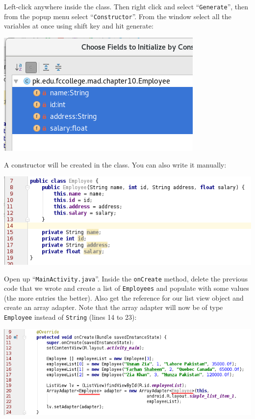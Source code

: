 Left-click anywhere inside the class. Then right click and select ``\texttt{Generate}'', then from the popup menu select ``\texttt{Constructor}''. From the window select all the variables at once using shift key and hit generate:

\begin{center}
	\includegraphics[scale=0.4]{chapters/ch10/images/13}
\end{center}

A constructor will be created in the class. You can also write it manually:

\begin{center}
	\includegraphics[scale=0.4]{chapters/ch10/images/14}
\end{center}

Open up ``\texttt{MainActivity.java}''. Inside the \texttt{onCreate} method, delete the previous code that we wrote and create a list of \texttt{Employees} and populate with some values (the more entries the better). Also get the reference for our list view object and create an array adapter. Note that the array adapter will now be of type \texttt{Employee} instead of \texttt{String} (lines 14 to 23):

\begin{center}
	\includegraphics[scale=0.4]{chapters/ch10/images/15}
\end{center}

